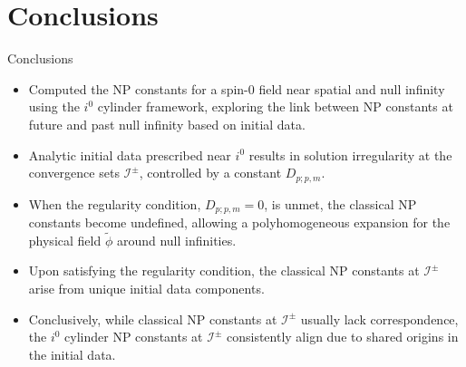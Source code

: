 \documentclass{beamer}
\theoremstyle{remark}
\theoremstyle{plain}
\theoremstyle{plain}
\begin{document}
\section{Conclusions}
\begin{frame}{Conclusions}
  \begin{itemize}
    \item Computed the NP constants for a spin-0 field near spatial and null infinity using the \(i^0\) cylinder framework, exploring the link between NP constants at future and past null infinity based on initial data. 
    \item Analytic initial data prescribed near \(i^0\) results in solution irregularity at the convergence sets \(\mathcal{I}^{\pm}\), controlled by a constant \(D_{p;p,m}\). 
    \item When the regularity condition, \(D_{p;p,m} = 0\), is unmet, the classical NP constants become undefined, allowing a polyhomogeneous expansion for the physical field \(\tilde{\phi}\) around null infinities. 
    \item Upon satisfying the regularity condition, the classical NP constants at \(\mathscr{I}^{\pm}\) arise from unique initial data components. 
    \item Conclusively, while classical NP constants at \(\mathscr{I}^{\pm}\) usually lack correspondence, the \(i^0\) cylinder NP constants at \(\mathscr{I}^{\pm}\) consistently align due to shared origins in the initial data.
  \end{itemize}
\end{frame}
\end{document}
